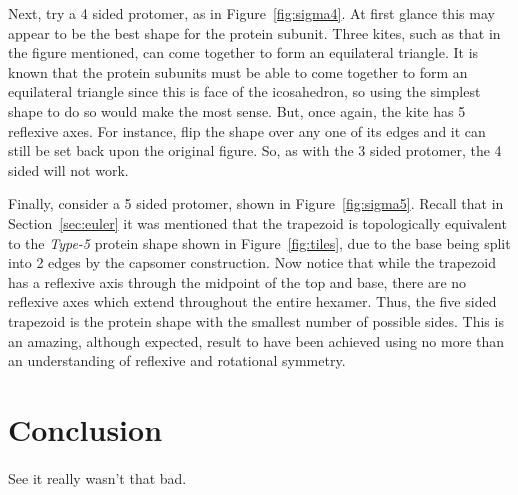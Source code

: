 \documentclass[12pt,letter]{article}
\begin{document}
Next, try a 4 sided protomer, as in Figure~\ref{fig:sigma4}. At first glance this may appear to be the best shape for the protein subunit. Three kites, such as that in the figure mentioned, can come together to form an equilateral triangle. It is known that the protein subunits must be able to come together to form an equilateral triangle since this is face of the icosahedron, so using the simplest shape to do so would make the most sense. But, once again, the kite has 5 reflexive axes. For instance, flip the shape over any one of its edges and it can still be set back upon the original figure. So, as with the 3 sided protomer, the 4 sided will not work.

Finally, consider a 5 sided protomer, shown in Figure~\ref{fig:sigma5}. Recall that in Section~\ref{sec:euler} it was mentioned that the trapezoid is topologically equivalent to the \textit{Type-5} protein shape shown in Figure~\ref{fig:tiles}, due to the base being split into 2 edges by the capsomer construction. Now notice that while the trapezoid has a reflexive axis through the midpoint of the top and base, there are no reflexive axes which extend throughout the entire hexamer. Thus, the five sided trapezoid is the protein shape with the smallest number of possible sides. This is an amazing, although expected, result to have been achieved using no more than an understanding of reflexive and rotational symmetry. 

\section{Conclusion}
\paragraph{}
See it really wasn't that bad.

\newpage


\end{document}
